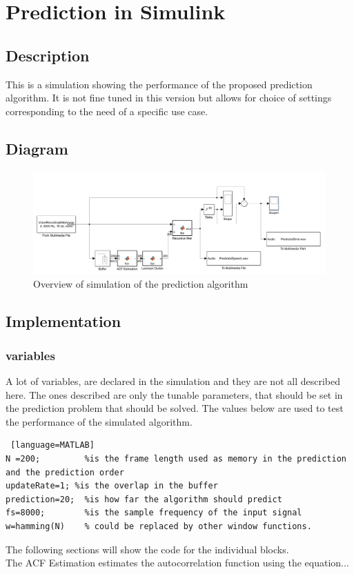 
\section{Prediction in Simulink}


\subsection{Description}
This is a simulation showing the performance of the proposed prediction algorithm. It is not fine tuned in this version but allows for choice of settings corresponding to the need of a specific use case.  


\subsection{Diagram}
\begin{figure} [h]
	\centering
	\includegraphics[width=\textwidth]{../Journal/Code/SimulinkPrediction}
	\caption{Overview of simulation of the prediction algorithm}
	\label{Fig:PredictionSimulink}
\end{figure}


\subsection{Implementation}

\subsubsection{variables}
A lot of variables, are declared in the simulation and they are not all described here. The ones described are only the tunable parameters, that should be set in the prediction problem that should be solved. The values below are used to test the performance of the simulated algorithm. 
\begin{lstlisting} [language=MATLAB]
N =200; 		%is the frame length used as memory in the prediction and the prediction order
updateRate=1; %is the overlap in the buffer
prediction=20;  %is how far the algorithm should predict 
fs=8000; 		%is the sample frequency of the input signal 
w=hamming(N)	% could be replaced by other window functions.
\end{lstlisting}
The following sections will show the code for the individual blocks. \\
The ACF Estimation estimates the autocorrelation function using the equation...
